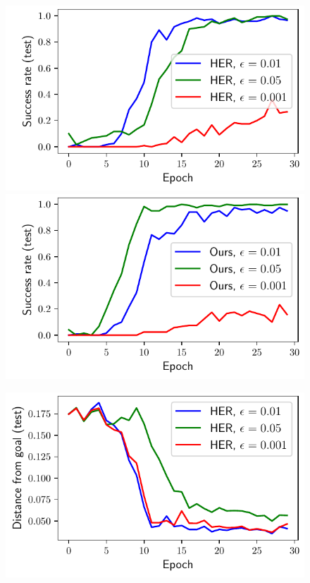 %
\begin{figure}%
  \def\frac{0.5}
\begin{minipage}[b]{\frac\linewidth}\centering
  \includegraphics[width=\frac\columnwidth]{media/res/ablate-ddpg-dqst-low_tresh_chosen-low_thresh_alt-ddpg/0.05-be0910cepoch-test/success_rate.pdf}%
  \includegraphics[width=\frac\columnwidth]{media/res/ablate-ddpg-dqst-low_tresh_chosen-low_thresh_alt-dqst/0.001-FetchPushPR-be467dfepoch-test/success_rate.pdf}%
  \label{fig:success-rate}
  \end{minipage}\begin{minipage}[b]{\frac\linewidth}\centering
  \includegraphics[width=\frac\columnwidth]{media/res/ablate-ddpg-dqst-low_tresh_chosen-low_thresh_alt-ddpg/0.05-be0910cepoch-test/ag_g_dist.pdf}%

\end{minipage}
\end{figure}
